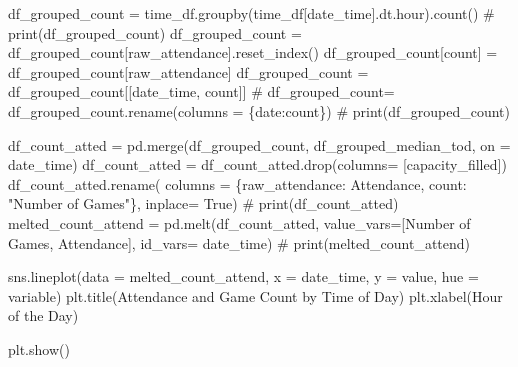 \documentclass[
  letterpaper,
  DIV=11,
  numbers=noendperiod]{scrartcl}
\newenvironment{Shaded}{\begin{snugshade}}{\end{snugshade}}
\newcommand{\CommentTok}[1]{\textcolor[rgb]{0.37,0.37,0.37}{#1}}
\newcommand{\NormalTok}[1]{\textcolor[rgb]{0.00,0.23,0.31}{#1}}
\newcommand{\OperatorTok}[1]{\textcolor[rgb]{0.37,0.37,0.37}{#1}}
\newcommand{\StringTok}[1]{\textcolor[rgb]{0.13,0.47,0.30}{#1}}
\newcommand{\VariableTok}[1]{\textcolor[rgb]{0.07,0.07,0.07}{#1}}
\begin{document}
\begin{Shaded}
\begin{Highlighting}[]
\NormalTok{df\_grouped\_count }\OperatorTok{=}\NormalTok{ time\_df.groupby(time\_df[}\StringTok{\textquotesingle{}date\_time\textquotesingle{}}\NormalTok{].dt.hour).count()}
\CommentTok{\# print(df\_grouped\_count)}
\NormalTok{df\_grouped\_count }\OperatorTok{=}\NormalTok{ df\_grouped\_count[}\StringTok{\textquotesingle{}raw\_attendance\textquotesingle{}}\NormalTok{].reset\_index()}
\NormalTok{df\_grouped\_count[}\StringTok{\textquotesingle{}count\textquotesingle{}}\NormalTok{] }\OperatorTok{=}\NormalTok{ df\_grouped\_count[}\StringTok{\textquotesingle{}raw\_attendance\textquotesingle{}}\NormalTok{]}
\NormalTok{df\_grouped\_count }\OperatorTok{=}\NormalTok{ df\_grouped\_count[[}\StringTok{\textquotesingle{}date\_time\textquotesingle{}}\NormalTok{, }\StringTok{\textquotesingle{}count\textquotesingle{}}\NormalTok{]]}
\CommentTok{\# df\_grouped\_count= df\_grouped\_count.rename(columns = \{\textquotesingle{}date\textquotesingle{}:\textquotesingle{}count\textquotesingle{}\})}
\CommentTok{\# print(df\_grouped\_count)}

\NormalTok{df\_count\_atted }\OperatorTok{=}\NormalTok{ pd.merge(df\_grouped\_count, df\_grouped\_median\_tod, on }\OperatorTok{=} \StringTok{\textquotesingle{}date\_time\textquotesingle{}}\NormalTok{)}
\NormalTok{df\_count\_atted }\OperatorTok{=}\NormalTok{ df\_count\_atted.drop(columns}\OperatorTok{=}\NormalTok{ [}\StringTok{\textquotesingle{}capacity\_filled\textquotesingle{}}\NormalTok{])}
\NormalTok{df\_count\_atted.rename( columns }\OperatorTok{=}\NormalTok{ \{}\StringTok{\textquotesingle{}raw\_attendance\textquotesingle{}}\NormalTok{: }\StringTok{\textquotesingle{}Attendance\textquotesingle{}}\NormalTok{, }\StringTok{\textquotesingle{}count\textquotesingle{}}\NormalTok{: }\StringTok{"Number of Games"}\NormalTok{\}, inplace}\OperatorTok{=} \VariableTok{True}\NormalTok{)}
\CommentTok{\# print(df\_count\_atted)}
\NormalTok{melted\_count\_attend }\OperatorTok{=}\NormalTok{ pd.melt(df\_count\_atted, value\_vars}\OperatorTok{=}\NormalTok{[}\StringTok{\textquotesingle{}Number of Games\textquotesingle{}}\NormalTok{, }\StringTok{\textquotesingle{}Attendance\textquotesingle{}}\NormalTok{], id\_vars}\OperatorTok{=} \StringTok{\textquotesingle{}date\_time\textquotesingle{}}\NormalTok{)}
\CommentTok{\# print(melted\_count\_attend)}

\NormalTok{sns.lineplot(data }\OperatorTok{=}\NormalTok{ melted\_count\_attend, x }\OperatorTok{=} \StringTok{\textquotesingle{}date\_time\textquotesingle{}}\NormalTok{, y }\OperatorTok{=} \StringTok{\textquotesingle{}value\textquotesingle{}}\NormalTok{, hue }\OperatorTok{=} \StringTok{\textquotesingle{}variable\textquotesingle{}}\NormalTok{)}
\NormalTok{plt.title(}\StringTok{\textquotesingle{}Attendance and Game Count by Time of Day\textquotesingle{}}\NormalTok{)}
\NormalTok{plt.xlabel(}\StringTok{\textquotesingle{}Hour of the Day\textquotesingle{}}\NormalTok{)}

\NormalTok{plt.show()}
\end{Highlighting}
\end{Shaded}
\end{document}
